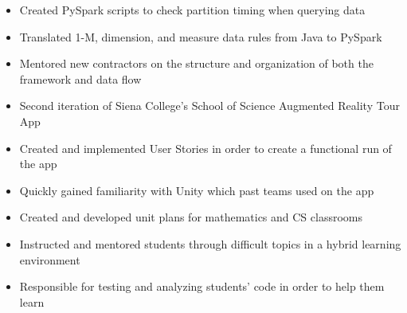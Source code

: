 \documentclass[
	a4paper,
]{fortysecondscv}
\begin{document}
\makefrontsidebar

\begin{cvtable}[1.5]
\end{cvtable}

\begin{cvtable}[1.5]
    \vspace{5mm}
		{\vspace{-3mm}\begin{itemize}[noitemsep, topsep=0pt]
		\item Created PySpark scripts to check partition timing when querying data
		\item Translated 1-M, dimension, and measure data rules from Java to PySpark
		\item Mentored new contractors on the structure and organization of both the framework and data flow
		\end{itemize}}
	
	\vspace{5mm}
		{\vspace{-3mm}\begin{itemize}[noitemsep, topsep=0pt]
		\item Second iteration of Siena College's School of Science Augmented Reality Tour App
		\item Created and implemented User Stories in order to create a functional run of the app
		\item Quickly gained familiarity with Unity which past teams used on the app
		\end{itemize}}
	
	\vspace{5mm}
		{\vspace{-3mm}\begin{itemize}[noitemsep, topsep=0pt]
		\item Created and developed unit plans for mathematics and CS classrooms
		\item Instructed and mentored students through difficult topics in a hybrid learning environment
		\item Responsible for testing and analyzing students' code in order to help them learn
		\end{itemize}}
		

\end{cvtable}
\end{document}
